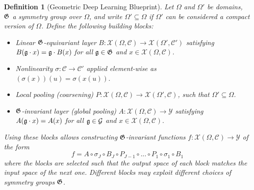 \documentclass[11pt]{article}
\numberwithin{equation}{section}
\newtheorem{defn}{Definition}[section]
\begin{document}
\begin{defn}[Geometric Deep Learning Blueprint]
Let $\Omega$ and $\Omega'$ be domains, $\mathfrak{G}$ a symmetry group over $\Omega$, and write $\Omega' \subseteq \Omega$ if $\Omega'$ can be considered a compact version of $\Omega$. Define the following building blocks: 
\begin{itemize}
\item Linear $\mathfrak{G}$-equivariant layer $B: \mathcal{X}(\Omega, \mathcal{C}) \rightarrow \mathcal{X}(\Omega', \mathcal{C}')$ satisfying $B(\mathfrak{g}\cdot x)= \mathfrak{g}\cdot B(x)$ for all $\mathfrak{g} \in \mathfrak{G}$ and $x \in \mathcal{X}(\Omega, \mathcal{C})$.
\item Nonlinearity $\sigma : \mathcal{C} \rightarrow \mathcal{C}'$ applied element-wise as $(\sigma(x))(u) = \sigma(x(u))$.
\item Local pooling (coarsening) $P: \mathcal{X}(\Omega, \mathcal{C}) \rightarrow \mathcal{X}(\Omega', \mathcal{C})$, such that $\Omega' \subseteq \Omega$.
\item $\mathfrak{G}$-invariant layer (global pooling) $A : \mathcal{X}(\Omega, \mathcal{C}) \rightarrow \mathcal{Y}$ satisfying $A(\mathfrak{g}\cdot x) = A(x)$ for all $\mathfrak{g} \in \mathcal{G}$ and $x \in \mathcal{X}(\Omega, \mathcal{C})$.
\end{itemize}
Using these blocks allows constructing $\mathfrak{G}$-invariant functions $f: \mathcal{X}(\Omega, \mathcal{C}) \rightarrow \mathcal{Y}$ of the form
\begin{equation}
f = A \circ \sigma_J \circ B_J \circ P_{J-1} \circ ... \circ P_1 \circ \sigma_1 \circ B_1
\end{equation}
where the blocks are selected such that the output space of each block matches the input space of the next one. Different blocks may exploit different choices of symmetry groups $\mathfrak{G}$.
\end{defn}

\newpage
 
\end{document}
